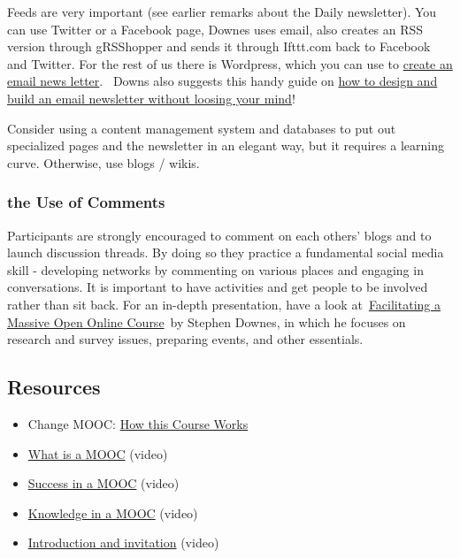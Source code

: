 Feeds are very important (see earlier remarks about the Daily
newsletter). You can use Twitter or a Facebook page, Downes uses email,
also creates an RSS version through gRSShopper and sends it through
Ifttt.com back to Facebook and Twitter. For the rest of us there is
Wordpress, which you can use to
\href{http://www.wpbeginner.com/wp-tutorials/create-a-free-email-newsletter-service-using-wordpress/\%20}{create
an email news letter}.~ Downs also suggests this handy guide on
\href{http://www.smashingmagazine.com/2010/01/19/design-and-build-an-email-newsletter-without-losing-your-mind/}{how
to design and build an email newsletter without loosing your mind}!

Consider using a content management system and databases to put out
specialized pages and the newsletter in an elegant way, but it requires
a learning curve. Otherwise, use blogs / wikis.

\subsubsection{the Use of Comments}

Participants are strongly encouraged to comment on each others' blogs
and to launch discussion threads. By doing so they practice a
fundamental social media skill - developing networks by commenting on
various places and engaging in conversations. It is important to have
activities and get people to be involved rather than sit back. For an
in-depth presentation, have a look
at~\href{http://www.downes.ca/presentation/290}{Facilitating a Massive
Open Online Course}~by Stephen Downes, in which he focuses on research
and survey issues, preparing events, and other essentials.

\subsection{Resources}

\begin{itemize}
\itemsep1pt\parskip0pt
\item
  Change MOOC: \href{http://change.mooc.ca/how.htm}{How this Course
  Works}
\item
  \href{http://www.youtube.com/watch?v=eW3gMGqcZQc}{What is a MOOC}
  (video)
\item
  \href{http://www.youtube.com/watch?v=r8avYQ5ZqM0}{Success in a MOOC}
  (video)
\item
  \href{http://www.youtube.com/watch?v=bWKdhzSAAG0}{Knowledge in a MOOC}
  (video)
\item
  \href{http://www.youtube.com/watch?v=mqnyhLfNH3I}{Introduction and
  invitation} (video)
\end{itemize}
